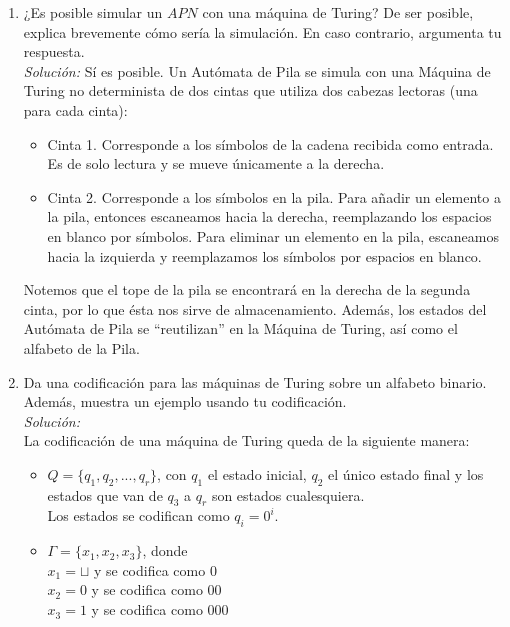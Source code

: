 \documentclass[letterpaper,10pt]{article}
\begin{document}
\begin{enumerate}
       
       \item ¿Es posible simular un $APN$ con una máquina de Turing? De ser 
       posible, explica brevemente cómo sería la simulación. En caso contrario,
       argumenta tu respuesta. \\
       \textit{Solución:} Sí es  posible. Un Autómata de Pila se simula con una
       Máquina de Turing no determinista de dos cintas que utiliza dos cabezas
       lectoras (una para cada cinta): 
       \begin{itemize}
           \item Cinta 1. Corresponde a los símbolos de la cadena recibida como
           entrada. Es de solo lectura y se mueve únicamente a la derecha.
           \item Cinta 2. Corresponde a los símbolos en la pila. Para añadir
           un elemento a la pila, entonces escaneamos hacia la derecha,
           reemplazando los espacios en blanco por símbolos. Para eliminar
           un elemento en la pila, escaneamos hacia la izquierda y reemplazamos
           los símbolos por espacios en blanco.
       \end{itemize}
       
       Notemos que el tope de la pila se encontrará en la derecha de la segunda
       cinta, por lo que ésta nos sirve de almacenamiento. Además, los estados
       del Autómata de Pila se ``reutilizan'' en la Máquina de Turing, así como
       el alfabeto de la Pila.
       
       \newpage
       \item Da una codificación para las máquinas de Turing sobre un alfabeto
       binario. Además, muestra un ejemplo usando tu codificación.\\
            \textit{Solución:}\\
       			La codificación de una máquina de Turing queda de la siguiente manera:\\
       			\begin{itemize}
       				\item $Q=\{ q_1,q_2,...,q_r\}$, con $q_1$ el estado inicial, $q_2$ el único estado final y los estados que van de $q_3$ a $q_r$ son estados cualesquiera.\\
       				Los estados se codifican como $q_i = 0^i$.
       				
       				\item $\Gamma=\{x_1,x_2,x_3\}$, donde\\
       					$x_1 = \sqcup$ y se codifica como $0$\\
       					$x_2=0$ y se codifica como $00$\\
       					$x_3=1$ y se codifica como $000$\\
       					

\end{itemize}
\end{enumerate}
\end{document}
